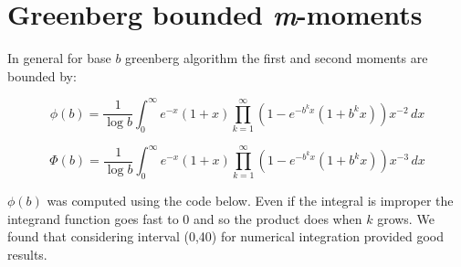 \begin{appendices}
\begin{table}[H]
\caption[\emph{Clipped Modified Binary Tree}: Performance report.]{\emph{Clipped Modified Binary Tree}: performance report. Experimental results obtained by running CMBT algorithm on  random generated instances.}
\begin{center}
\end{center}
\end{table}


\section{Greenberg bounded \emph{m}-moments}
\label{sec:greenberg-moments}
In general for base $b$ greenberg algorithm the first and second moments are bounded by:

\begin{equation}
\phi(b)= \frac{1}{\log b} \int_{0}^{\infty} \! e^{-x}(1+x) \prod_{k=1}^{\infty}(1-e^{-b^{k}x}(1+b^{k}x))x^{-2} \, dx
\label{eq:greenberg-b-phi}
\end{equation}

\begin{equation}
\Phi(b)= \frac{1}{\log b} \int_{0}^{\infty} \! e^{-x}(1+x) \prod_{k=1}^{\infty}(1-e^{-b^{k}x}(1+b^{k}x))x^{-3} \, dx
\label{eq:greenberg-b-Phi}
\end{equation}

\noindent $\phi(b)$ was computed using the code below. Even if the integral is improper the integrand function goes fast to 0 and so the product does when $k$ grows. We found that considering interval (0,40) for numerical integration provided good results.\\







\end{appendices}
